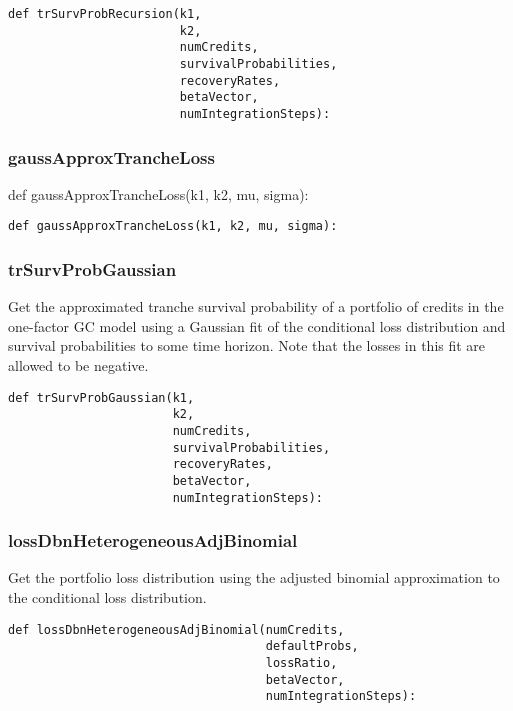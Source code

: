 \documentclass[twoside,11pt]{book}
\begin{document}
\begin{lstlisting}
def trSurvProbRecursion(k1,
                        k2,
                        numCredits,
                        survivalProbabilities,
                        recoveryRates,
                        betaVector,
                        numIntegrationSteps):
\end{lstlisting}

\subsubsection*{{\bf gaussApproxTrancheLoss}}
def gaussApproxTrancheLoss(k1, k2, mu, sigma): 

\begin{lstlisting}
def gaussApproxTrancheLoss(k1, k2, mu, sigma):
\end{lstlisting}

\subsubsection*{{\bf trSurvProbGaussian}}
Get the approximated tranche survival probability of a portfolio of credits in the one-factor GC model using a Gaussian fit of the conditional loss distribution and survival probabilities to some time horizon. Note that the losses in this fit are allowed to be negative.  

\begin{lstlisting}
def trSurvProbGaussian(k1,
                       k2,
                       numCredits,
                       survivalProbabilities,
                       recoveryRates,
                       betaVector,
                       numIntegrationSteps):
\end{lstlisting}

\subsubsection*{{\bf lossDbnHeterogeneousAdjBinomial}}
Get the portfolio loss distribution using the adjusted binomial approximation to the conditional loss distribution.  

\begin{lstlisting}
def lossDbnHeterogeneousAdjBinomial(numCredits,
                                    defaultProbs,
                                    lossRatio,
                                    betaVector,
                                    numIntegrationSteps):
\end{lstlisting}
\end{document}
